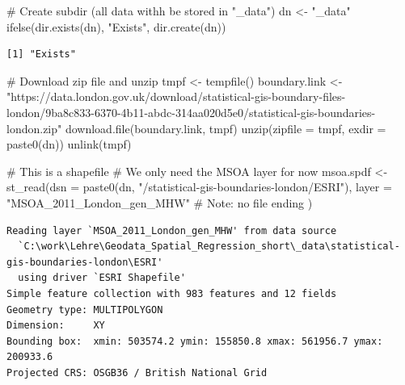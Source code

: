 \documentclass[
  letterpaper,
  DIV=11,
  numbers=noendperiod]{scrreprt}
\newenvironment{Shaded}{\begin{snugshade}}{\end{snugshade}}
\newcommand{\AttributeTok}[1]{\textcolor[rgb]{0.40,0.45,0.13}{#1}}
\newcommand{\CommentTok}[1]{\textcolor[rgb]{0.37,0.37,0.37}{#1}}
\newcommand{\FunctionTok}[1]{\textcolor[rgb]{0.28,0.35,0.67}{#1}}
\newcommand{\NormalTok}[1]{\textcolor[rgb]{0.00,0.23,0.31}{#1}}
\newcommand{\OtherTok}[1]{\textcolor[rgb]{0.00,0.23,0.31}{#1}}
\newcommand{\StringTok}[1]{\textcolor[rgb]{0.13,0.47,0.30}{#1}}
\begin{document}
\begin{Shaded}
\begin{Highlighting}[]
\CommentTok{\# Create subdir (all data withh be stored in "\_data")}
\NormalTok{dn }\OtherTok{\textless{}{-}} \StringTok{"\_data"}
\FunctionTok{ifelse}\NormalTok{(}\FunctionTok{dir.exists}\NormalTok{(dn), }\StringTok{"Exists"}\NormalTok{, }\FunctionTok{dir.create}\NormalTok{(dn))}
\end{Highlighting}
\end{Shaded}

\begin{verbatim}
[1] "Exists"
\end{verbatim}

\begin{Shaded}
\begin{Highlighting}[]
\CommentTok{\# Download zip file and unzip}
\NormalTok{tmpf }\OtherTok{\textless{}{-}} \FunctionTok{tempfile}\NormalTok{()}
\NormalTok{boundary.link }\OtherTok{\textless{}{-}} \StringTok{"https://data.london.gov.uk/download/statistical{-}gis{-}boundary{-}files{-}london/9ba8c833{-}6370{-}4b11{-}abdc{-}314aa020d5e0/statistical{-}gis{-}boundaries{-}london.zip"}
\FunctionTok{download.file}\NormalTok{(boundary.link, tmpf)}
\FunctionTok{unzip}\NormalTok{(}\AttributeTok{zipfile =}\NormalTok{ tmpf, }\AttributeTok{exdir =} \FunctionTok{paste0}\NormalTok{(dn))}
\FunctionTok{unlink}\NormalTok{(tmpf)}

\CommentTok{\# This is a shapefile}
\CommentTok{\# We only need the MSOA layer for now}
\NormalTok{msoa.spdf }\OtherTok{\textless{}{-}} \FunctionTok{st\_read}\NormalTok{(}\AttributeTok{dsn =} \FunctionTok{paste0}\NormalTok{(dn, }\StringTok{"/statistical{-}gis{-}boundaries{-}london/ESRI"}\NormalTok{),}
                     \AttributeTok{layer =} \StringTok{"MSOA\_2011\_London\_gen\_MHW"} \CommentTok{\# Note: no file ending}
\NormalTok{                     )}
\end{Highlighting}
\end{Shaded}

\begin{verbatim}
Reading layer `MSOA_2011_London_gen_MHW' from data source 
  `C:\work\Lehre\Geodata_Spatial_Regression_short\_data\statistical-gis-boundaries-london\ESRI' 
  using driver `ESRI Shapefile'
Simple feature collection with 983 features and 12 fields
Geometry type: MULTIPOLYGON
Dimension:     XY
Bounding box:  xmin: 503574.2 ymin: 155850.8 xmax: 561956.7 ymax: 200933.6
Projected CRS: OSGB36 / British National Grid
\end{verbatim}
\end{document}
